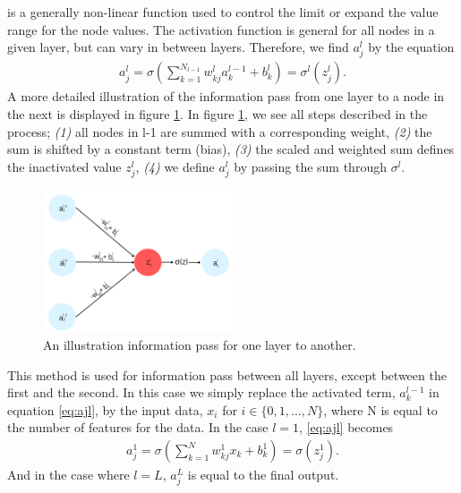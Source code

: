 is a generally non-linear function used to control the limit or expand the value range for the node values. The activation 
function is general for all nodes in a given layer, but can vary in between layers. Therefore,
we find $a_j^l$ by the equation
\begin{align}\label{eq:ajl}
    a_j^l = \sigma \left (\sum_{k=1} ^ {N_{l-1}} w_{kj}^la_k^{l-1} + b^l_k\right ) = \sigma^l(z_j^l).
\end{align}
A more detailed illustration of the information pass from one layer to a node in the next is displayed 
in figure \ref{fig:WB}. In figure \ref{fig:WB}, we see all steps described in the process; \emph{(1)} all nodes in 
l-1 are summed with a corresponding weight, \emph{(2)} the sum is shifted by a constant term (bias), \emph{(3)} the 
scaled and weighted sum defines the inactivated value $z_j^l$, \emph{(4)} we define $a^l_j$ by passing the 
sum through $\sigma^l$.  
\begin{figure}
    \centering
    \includegraphics[width=0.5\textwidth]{Figures/Illustrations/WeightBias.png}
    \caption{An illustration information pass for one layer to another.}
    \label{fig:WB}
\end{figure}
This method is used for information pass between all layers, except between the first and the second. 
In this case we simply replace the activated term, $a_k^{l-1}$ in equation \ref{eq:ajl}, by the input data,
$x_i$ for $i\in\{0,1,...,N\}$, where N is equal to the number of features for the data. In the case $l=1$, \ref{eq:ajl} 
becomes
\begin{align}
    a_j^1 = \sigma \left (\sum_{k=1} ^ {N} w_{kj}^1x_k + b^1_k\right ) = \sigma(z_j^1).
\end{align}
And in the case where $l=L$, $a_j^L$ is equal to the final output. 
